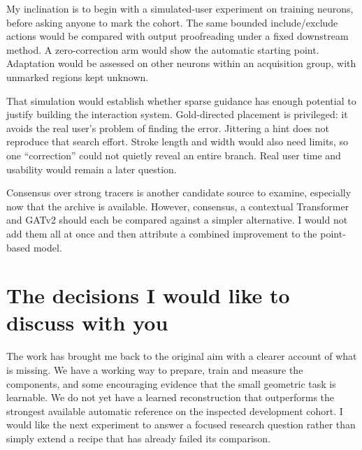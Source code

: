 \documentclass[11pt,a4paper]{article}
\begin{document}
My inclination is to begin with a simulated-user experiment on training neurons, before asking anyone to mark the cohort. The same bounded include/exclude actions would be compared with output proofreading under a fixed downstream method. A zero-correction arm would show the automatic starting point. Adaptation would be assessed on other neurons within an acquisition group, with unmarked regions kept unknown.

That simulation would establish whether sparse guidance has enough potential to justify building the interaction system. Gold-directed placement is privileged: it avoids the real user's problem of finding the error. Jittering a hint does not reproduce that search effort. Stroke length and width would also need limits, so one ``correction'' could not quietly reveal an entire branch. Real user time and usability would remain a later question.

Consensus over strong tracers is another candidate source to examine, especially now that the archive is available. However, consensus, a contextual Transformer and GATv2 should each be compared against a simpler alternative. I would not add them all at once and then attribute a combined improvement to the point-based model.

\clearpage
\section{The decisions I would like to discuss with you}
The work has brought me back to the original aim with a clearer account of what is missing. We have a working way to prepare, train and measure the components, and some encouraging evidence that the small geometric task is learnable. We do not yet have a learned reconstruction that outperforms the strongest available automatic reference on the inspected development cohort. I would like the next experiment to answer a focused research question rather than simply extend a recipe that has already failed its comparison.
\end{document}
